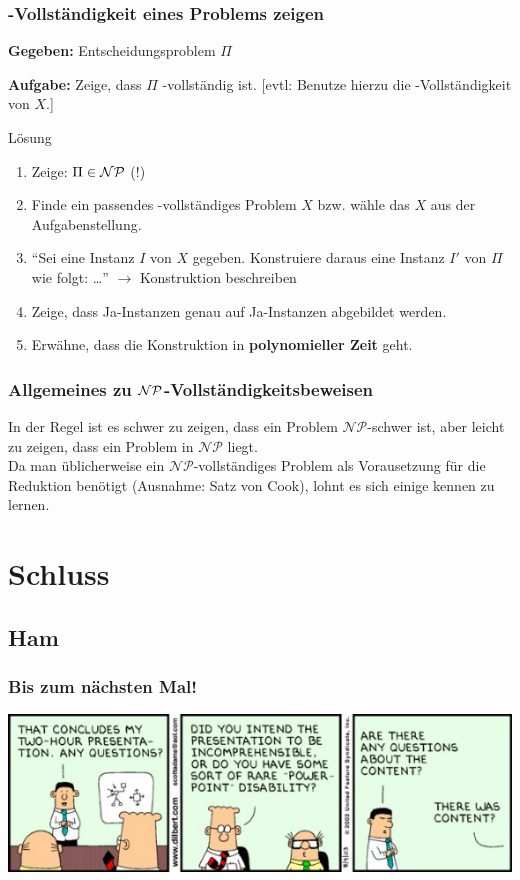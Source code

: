 \begin{frame}
	\frametitle{\recipe \classNP{}-Vollständigkeit eines Problems zeigen}
	
	\textbf{Gegeben:} Entscheidungsproblem $\Pi$
	
	\textbf{Aufgabe:} Zeige, dass $\Pi$ \classNP{}-vollständig ist. [evtl: Benutze hierzu die \classNP{}-Vollständigkeit von $X$.]
	
	\ducttape{.5cm}

	\begin{block}{Lösung}	
	\begin{enumerate}
		\item Zeige: $\Pi \in \mathcal{NP}$ (!)
		\item Finde ein passendes \classNP{}-vollständiges Problem $X$ bzw. wähle das $X$ aus der Aufgabenstellung.
		\item "`Sei eine Instanz $I$ von $X$ gegeben. Konstruiere daraus eine Instanz $I'$ von $\Pi$ wie folgt: …"' $\rightarrow$ Konstruktion beschreiben
		\item Zeige, dass Ja-Instanzen genau auf Ja-Instanzen abgebildet werden.
		\item Erwähne, dass die Konstruktion in \textbf{polynomieller Zeit} geht.
	\end{enumerate}
		
	\end{block}
	
\end{frame}

\begin{frame}
\frametitle{Allgemeines zu $\mathcal{NP}$-Vollständigkeitsbeweisen}
In der Regel ist es schwer zu zeigen, dass ein Problem $\mathcal{NP}$-schwer ist, aber leicht zu zeigen, dass ein Problem in $\mathcal{NP}$ liegt.\\[8pt]
Da man üblicherweise ein $\mathcal{NP}$-vollständiges Problem als Vorausetzung für die Reduktion benötigt (Ausnahme: Satz von Cook), lohnt es sich einige kennen zu lernen.
\end{frame}

\section{Schluss}
\subsection{Ham}

\begin{frame}
	\frametitle{Bis zum nächsten Mal!}
	
	\begin{center}
		\includegraphics[width=\textwidth]{images/221_strip.jpg}
	\end{center}
\end{frame}


